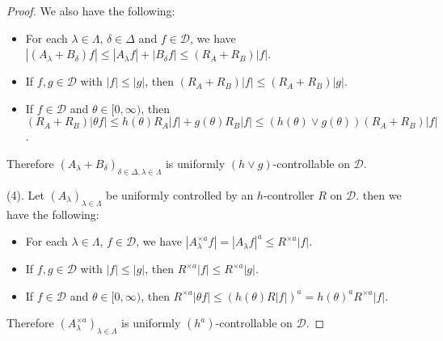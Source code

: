 \documentclass[12pt,a4paper]{amsart}
\theoremstyle{plain}
\theoremstyle{definition}
\numberwithin{equation}{section}
\begin{document}
\begin{proof}
    We also have the following:
\begin{itemize}
\item
    For each $\lambda \in \Lambda$, $\delta \in \Delta$ and $f\in \mathcal D$, we have $|(A_\lambda + B_\delta) f| \leq |A_\lambda f| + |B_\delta f| \leq (R_A + R_B) |f|$.
\item
    If $f,g \in \mathcal D$ with $|f|\leq |g|$, then $(R_A + R_B)|f| \leq (R_A + R_B) |g|$.
\item
    If $f \in \mathcal D$ and $\theta \in [0,\infty)$, then $(R_A + R_B) |\theta f| \leq h(\theta) R_A|f| + g(\theta) R_B|f| \leq (h(\theta) \vee g(\theta)) (R_A+R_B)|f| $.
\end{itemize}
    Therefore $(A_\lambda + B_\delta)_{\delta\in \Delta, \lambda \in \Lambda}$ is uniformly $(h \vee g)$-controllable on $\mathcal D$.

    (4). Let $(A_\lambda)_{\lambda\in\Lambda}$ be uniformly controlled by an $h$-controller $R$ on $\mathcal D$.
then we have the following:
\begin{itemize}
\item
    For each $\lambda \in \Lambda$, $f\in \mathcal D$, we have $|A_\lambda^{\times a} f| = |A_\lambda f|^a  \leq R^{\times a} |f|$.
\item
    If $f,g \in \mathcal D$ with $|f|\leq |g|$, then $R^{\times a}|f| \leq R^{\times a} |g|$.
\item
    If $f \in \mathcal D$ and $\theta \in [0,\infty)$, then $R^{\times a}|\theta f| \leq (h(\theta) R |f|)^a = h(\theta)^a R^{\times a}|f|$.
\end{itemize}
    Therefore $(A_\lambda^{\times a})_{\lambda \in \Lambda}$ is uniformly $(h^a)$-controllable on $\mathcal D$.
\end{proof}
\end{document}
